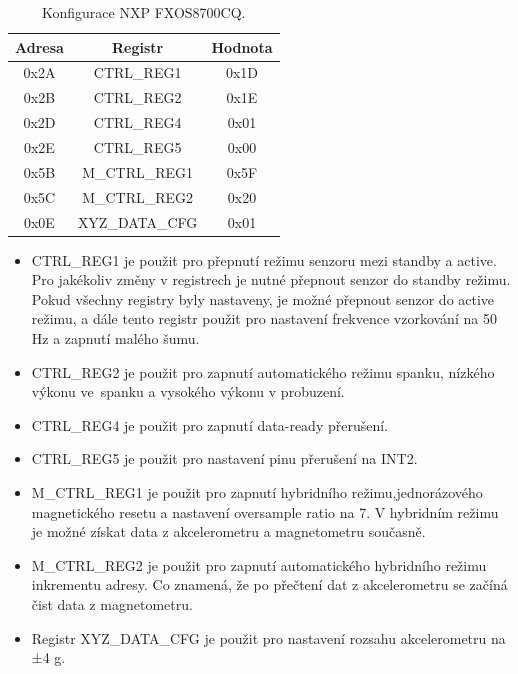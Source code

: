 \begin{table}[!h]
    \centering
	\begin{tabular}{ccc}
        \hline
        \textbf{Adresa} & \textbf{Registr} & \textbf{Hodnota} \\
        \hline
        0x2A            & CTRL\_REG1       & 0x1D             \\
        0x2B            & CTRL\_REG2       & 0x1E             \\
        0x2D            & CTRL\_REG4       & 0x01             \\
        0x2E            & CTRL\_REG5       & 0x00             \\
        0x5B            & M\_CTRL\_REG1    & 0x5F             \\
        0x5C            & M\_CTRL\_REG2    & 0x20             \\
        0x0E            & XYZ\_DATA\_CFG   & 0x01             \\
        \hline
    \end{tabular}
    \caption{Konfigurace NXP FXOS8700CQ\cite{FXOS8700CQ}.}
    \label{tab:FXOS8700CQ}
\end{table}

\begin{itemize}
    \item CTRL\_REG1 je použit pro přepnutí režimu senzoru mezi standby a active.
    Pro jakékoliv změny v registrech je nutné přepnout senzor do standby režimu.
    Pokud všechny registry byly nastaveny, je možné přepnout senzor do active
    režimu, a dále tento registr použit pro nastavení frekvence vzorkování na 50 Hz
    a zapnutí malého šumu.

    \item CTRL\_REG2 je použit pro zapnutí automatického režimu spanku, nízkého
    výkonu ve~spanku a vysokého výkonu v probuzení.

    \item CTRL\_REG4 je použit pro zapnutí data-ready přerušení.

    \item CTRL\_REG5 je použit pro nastavení pinu přerušení na INT2.

    \item M\_CTRL\_REG1 je použit pro zapnutí hybridního režimu,jednorázového
    magnetického resetu a nastavení oversample ratio na 7. V hybridním režimu je
    možné získat data z akcelerometru a magnetometru současně.

    \item M\_CTRL\_REG2 je použit pro zapnutí automatického hybridního režimu
    inkrementu adresy. Co znamená, že po přečtení dat z akcelerometru se začíná čist
    data z magnetometru.

    \item Registr XYZ\_DATA\_CFG je použit pro nastavení rozsahu akcelerometru na ±4
    g\cite{FXOS8700CQ}.
\end{itemize}


